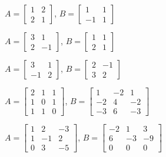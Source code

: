 \documentclass{ximera}
\begin{document}
\begin{problem}\label{prob:notsimilar_a}
$A = \begin{bmatrix}
	1 & 2 \\
	2 & 1
\end{bmatrix}$, $B =
\begin{bmatrix}
	1 & 1\\
	-1 & 1
\end{bmatrix}$
\end{problem}

\begin{problem}\label{prob:notsimilar_b}
$A =
\begin{bmatrix}
3 & 1 \\
2 & -1
\end{bmatrix}$, $B =
\begin{bmatrix}
1 & 1 \\
2 & 1
\end{bmatrix}$
\end{problem}

\begin{problem}\label{prob:notsimilar_c}
$A =
\begin{bmatrix}
3 & 1 \\
-1 & 2
\end{bmatrix}$, $B =
\begin{bmatrix}
2 & -1 \\
3 & 2
\end{bmatrix}$
\end{problem}

\begin{problem}\label{prob:notsimilar_d}
$A =
\begin{bmatrix}
2 & 1 & 1 \\
1 & 0 & 1 \\
1 & 1 & 0
\end{bmatrix}$, $B =
\begin{bmatrix}
 1 & -2 & 1 \\
-2 & 4 & -2 \\
-3 & 6 & -3
\end{bmatrix}$
\end{problem}

\begin{problem}\label{prob:notsimilar_e}
$A =
\begin{bmatrix}
1 & 2 & -3 \\
1 & -1 & 2 \\
0 & 3 & -5
\end{bmatrix}$, $B =
\begin{bmatrix}
-2 & 1 & 3 \\
 6 & -3 & -9 \\
 0 & 0 & 0
\end{bmatrix}$
\end{problem}
\end{document}
